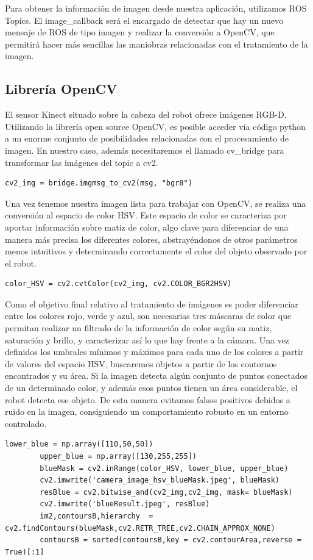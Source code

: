 \documentclass[12pt,spanish,chapterprefix, numbers=noenddot]{book}
\numberwithin{equation}{section}
\numberwithin{figure}{section}
\begin{document}
Para obtener la información de imagen desde nuestra aplicación, utilizamos ROS Topics. El image\_callback será el encargado de detectar que hay un nuevo mensaje de ROS de tipo imagen y realizar la conversión a OpenCV, que permitirá hacer más sencillas las maniobras relacionadas con el tratamiento de la imagen.
\subsection{Librería OpenCV} 
El sensor Kinect situado sobre la cabeza del robot ofrece imágenes RGB-D. Utilizando la librería open source OpenCV, es posible acceder vía código python a un enorme conjunto de posibilidades relacionadas con el procesamiento de imagen. \cite{open_cv} 
En nuestro caso, además necesitaremos el llamado cv\_bridge para transformar las imágenes del topic a cv2. 
\vspace{20pt}
	\begin{lstlisting}[frame=single]    
    cv2_img = bridge.imgmsg_to_cv2(msg, "bgr8")
	\end{lstlisting}
Una vez tenemos nuestra imagen lista para trabajar con OpenCV, se realiza una conversión al espacio de color HSV.
Este espacio de color se caracteriza por aportar información sobre matiz de color, algo clave para diferenciar de una manera más precisa los diferentes colores, abstrayéndonos de otros parámetros menos intuitivos y determinando correctamente el color del objeto observado por el robot. 

\vspace{20pt}
	\begin{lstlisting}[frame=single] 
    color_HSV = cv2.cvtColor(cv2_img, cv2.COLOR_BGR2HSV)
	\end{lstlisting}
Como el objetivo final relativo al tratamiento de imágenes es poder diferenciar entre los colores rojo, verde y azul, son necesarias tres máscaras de color que permitan realizar un filtrado de la información de color según su matiz, saturación y brillo, y caracterizar así lo que hay frente a la cámara. 
Una vez definidos los umbrales mínimos y máximos para cada uno de los colores a partir de valores del espacio HSV, buscaremos objetos a partir de los contornos encontrados y su área. Si la imagen detecta algún conjunto de puntos conectados de un determinado color, y además esos puntos tienen un área considerable, el robot detecta ese objeto. De esta manera evitamos falsos positivos debidos a ruido en la imagen, consiguiendo un comportamiento robusto en un entorno controlado. 
\vspace{20pt}
	\begin{lstlisting}[frame=single] 
	    lower_blue = np.array([110,50,50])
        upper_blue = np.array([130,255,255])
        blueMask = cv2.inRange(color_HSV, lower_blue, upper_blue)
        cv2.imwrite('camera_image_hsv_blueMask.jpeg', blueMask)
        resBlue = cv2.bitwise_and(cv2_img,cv2_img, mask= blueMask)
        cv2.imwrite('blueResult.jpeg', resBlue)
        im2,contoursB,hierarchy  = cv2.findContours(blueMask,cv2.RETR_TREE,cv2.CHAIN_APPROX_NONE)
        contoursB = sorted(contoursB,key = cv2.contourArea,reverse = True)[:1] 
	\end{lstlisting}
\end{document}
